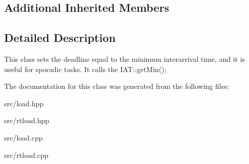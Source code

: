 \subsection*{Additional Inherited Members}


\subsection{Detailed Description}
This class sets the deadline equal to the minimum interarrival time, and it is useful for sporadic tasks. It calls the I\+A\+T\+::get\+Min(); 

The documentation for this class was generated from the following files\+:\begin{DoxyCompactItemize}
\item 
src/load.\+hpp\item 
src/rtload.\+hpp\item 
src/load.\+cpp\item 
src/rtload.\+cpp\end{DoxyCompactItemize}
